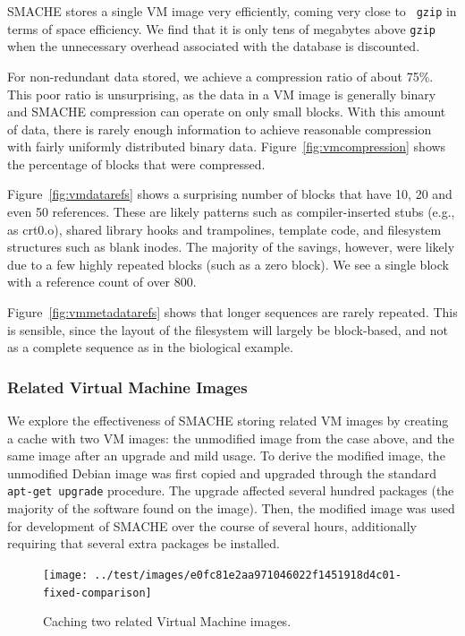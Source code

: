 \documentclass{sigplanconf}[11pt]
\begin{document}
SMACHE stores a single VM image very efficiently, coming very close to {\tt
gzip} in terms of space efficiency.  We find that it is only tens of megabytes
above {\tt gzip} when the unnecessary overhead associated with the database is
discounted.

For non-redundant data stored, we achieve a compression ratio of about 75\%.
This poor ratio is unsurprising, as the data in a VM image is generally binary
and SMACHE compression can operate on only small blocks.  With this amount of
data, there is rarely enough information to achieve reasonable compression with
fairly uniformly distributed binary data.  Figure~\ref{fig:vmcompression} shows
the percentage of blocks that were compressed.

Figure~\ref{fig:vmdatarefs} shows a surprising number of blocks that have 10,
20 and even 50 references.  These are likely patterns such as compiler-inserted
stubs (e.g., as crt0.o), shared library hooks and trampolines, template code,
and filesystem structures such as blank inodes.  The majority of the savings,
however, were likely due to a few highly repeated blocks (such as a zero
block).  We see a single block with a reference count of over 800.

Figure~\ref{fig:vmmetadatarefs} shows that longer sequences are rarely
repeated.  This is sensible, since the layout of the filesystem will largely be
block-based, and not as a complete sequence as in the biological example.

\subsubsection*{Related Virtual Machine Images}

We explore the effectiveness of SMACHE storing related VM images by creating a
cache with two VM images: the unmodified image from the case above, and the
same image after an upgrade and mild usage.  To derive the modified image, the
unmodified Debian image was first copied and upgraded through the standard {\tt
apt-get upgrade} procedure.  The upgrade affected several hundred packages (the
majority of the software found on the image).  Then, the modified image was
used for development of SMACHE over the course of several hours, additionally
requiring that several extra packages be installed.

\begin{figure}
\begin{center}
\texttt{[image: ../test/images/e0fc81e2aa971046022f1451918d4c01-fixed-comparison]}
\caption{\label{fig:relvmcomparison}Caching two related Virtual Machine images.}
\end{center}
\end{figure}
\end{document}
